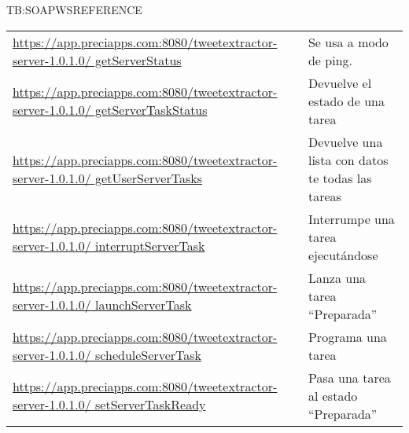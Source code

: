 \begin{table}[Referencia de servicios web SOAP de TweetExtractorServer]{TB:SOAPWSREFERENCE}
\begin{tabular}{|p{10cm}|p{7cm}|}
	\href{https://app.preciapps.com:8080/tweetextractor-server-1.0.1.0/getServerStatus?wsdl}{https://app.preciapps.com:8080/tweetextractor-server-1.0.1.0/ getServerStatus} & Se usa a modo de ping. \\
	\href{https://app.preciapps.com:8080/tweetextractor-server-1.0.1.0/getServerTaskStatus?wsdl}{https://app.preciapps.com:8080/tweetextractor-server-1.0.1.0/ getServerTaskStatus} & Devuelve el estado de una tarea \\
	\href{https://app.preciapps.com:8080/tweetextractor-server-1.0.1.0/getUserServerTasks?wsdl}{https://app.preciapps.com:8080/tweetextractor-server-1.0.1.0/ getUserServerTasks} & Devuelve una lista con datos te todas las tareas \\
	\href{https://app.preciapps.com:8080/tweetextractor-server-1.0.1.0/interruptServerTask?wsdl}{https://app.preciapps.com:8080/tweetextractor-server-1.0.1.0/ interruptServerTask} &  Interrumpe una tarea ejecutándose\\
	\href{https://app.preciapps.com:8080/tweetextractor-server-1.0.1.0/launchServerTask?wsdl}{https://app.preciapps.com:8080/tweetextractor-server-1.0.1.0/ launchServerTask} &  Lanza una tarea ``Preparada''\\
	\href{https://app.preciapps.com:8080/tweetextractor-server-1.0.1.0/scheduleServerTask?wsdl}{https://app.preciapps.com:8080/tweetextractor-server-1.0.1.0/ scheduleServerTask} & Programa una tarea \\
	\href{https://app.preciapps.com:8080/tweetextractor-server-1.0.1.0/setServerTaskReady?wsdl}{https://app.preciapps.com:8080/tweetextractor-server-1.0.1.0/ setServerTaskReady} & Pasa una tarea al estado ``Preparada'' \\
	\hline \hline
	\hline
	\end{tabular}
\end{table}
